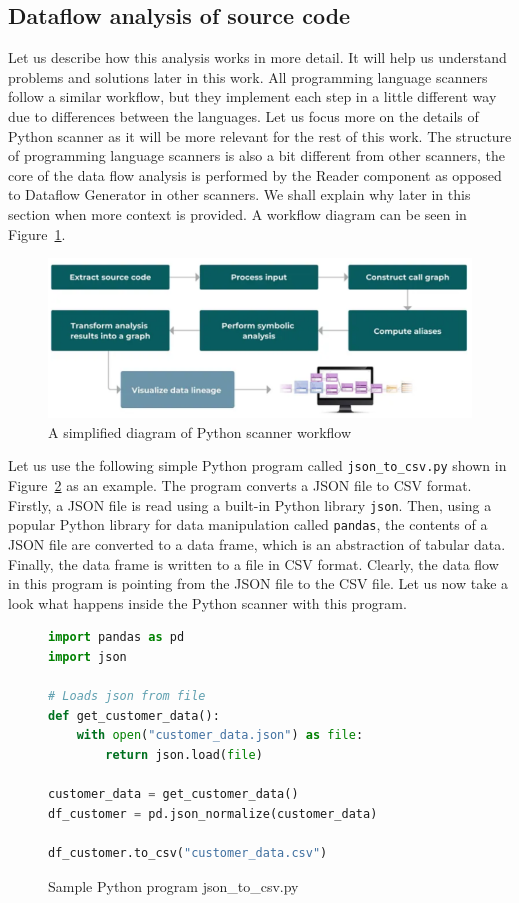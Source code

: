 \subsection{Dataflow analysis of source code}

Let us describe how this analysis works in more detail. It will help us understand problems and solutions later in this work. All programming language scanners follow a similar workflow, but they implement each step in a little different way due to differences between the languages. Let us focus more on the details of Python scanner as it will be more relevant for the rest of this work. The structure of programming language scanners is also a bit different from other scanners, the core of the data flow analysis is performed by the Reader component as opposed to Dataflow Generator in other scanners. We shall explain why later in this section when more context is provided. A workflow diagram can be seen in Figure~\ref{fig02:pythonWorkflow}.

\begin{figure}[ht]\centering
\includegraphics[width=1.0\textwidth]{img/python_workflow.PNG}
\caption{A simplified diagram of Python scanner workflow}
\label{fig02:pythonWorkflow}
\end{figure}  

Let us use the following simple Python program called \texttt{json\_to\_csv.py} shown in Figure~\ref{fig:pythonSample} as an example. The program converts a JSON file to CSV format. Firstly, a JSON file is read using a built-in Python library \texttt{json}. Then, using a popular Python library for data manipulation called \texttt{pandas}, the contents of a JSON file are converted to a data frame, which is an abstraction of tabular data. Finally, the data frame is written to a file in CSV format. Clearly, the data flow in this program is pointing from the JSON file to the CSV file. Let us now take a look what happens inside the Python scanner with this program.

\begin{figure}[ht]
\begin{lstlisting}[language=Python] 
import pandas as pd
import json

# Loads json from file
def get_customer_data():
    with open("customer_data.json") as file:
        return json.load(file)

customer_data = get_customer_data()
df_customer = pd.json_normalize(customer_data)

df_customer.to_csv("customer_data.csv")
\end{lstlisting}
\caption{Sample Python program json\_to\_csv.py}
\label{fig:pythonSample}
\end{figure}

